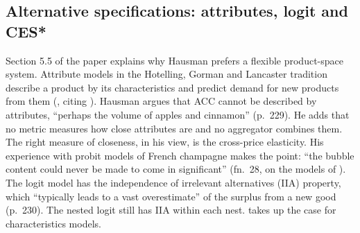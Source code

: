 \subsection{Alternative specifications: attributes, logit and CES*}\label{sec:10-hausman-ces}

Section 5.5 of the paper explains why Hausman prefers a flexible product-space system. Attribute models in
the Hotelling, Gorman and Lancaster tradition describe a product by its characteristics and predict demand
for new products from them (\citealp[fn.~27]{Hausman1997}, citing \citealp{PakesBerryLevinsohn1993}).
Hausman argues that ACC cannot be described by attributes, ``perhaps the volume of apples and cinnamon''
(p.~229). He adds that no metric measures how close attributes are and no aggregator combines them. The
right measure of closeness, in his view, is the cross-price elasticity. His experience with probit models of
French champagne makes the point: ``the bubble content could never be made to come in significant'' (fn.~28,
on the models of \citealp{HausmanWise1978}). The logit model has the independence of irrelevant alternatives
(IIA) property, which ``typically leads to a vast overestimate'' of the surplus from a new good (p.~230). The
nested logit still has IIA within each nest.  takes up the case for characteristics
models.

